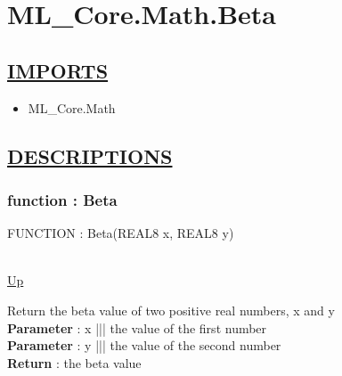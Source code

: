 \chapter*{ML\_Core.Math.Beta}
\hypertarget{ML_Core.Math.Beta}{}

\section*{\underline{IMPORTS}}
\begin{itemize}
\item ML\_Core.Math
\end{itemize}

\section*{\underline{DESCRIPTIONS}}
\subsection*{function : Beta}
\hypertarget{ecldoc:ml_core.math.beta}{FUNCTION : Beta(REAL8 x, REAL8 y)} \\
\hyperlink{ecldoc:}{Up} \\
\par
Return the beta value of two positive real numbers, x and y \\
\textbf{Parameter} : x ||| the value of the first number \\
\textbf{Parameter} : y ||| the value of the second number \\
\textbf{Return} : the beta value \\
